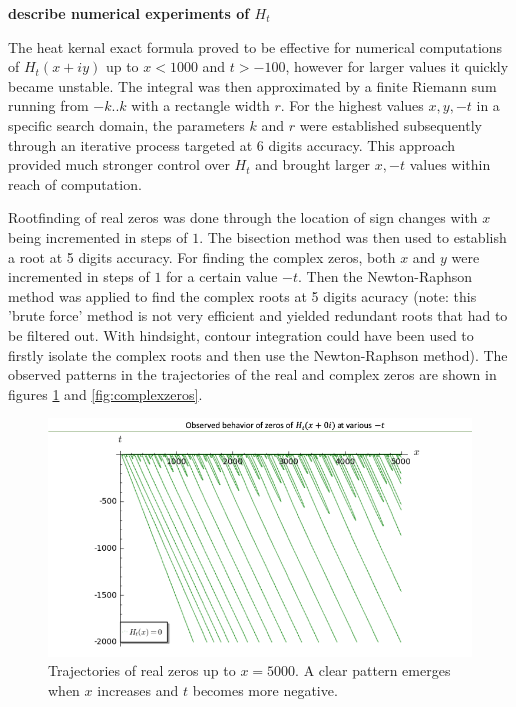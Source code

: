 \documentclass[a4paper,11pt,twoside]{amsart}
\begin{document}
{\bf describe numerical experiments of $H_t$}

The heat kernal exact formula proved to be effective for numerical computations of $H_t(x+iy)$ up to $x<1000$ and $t > -100$, however for larger values it quickly became unstable. The integral was then approximated by a finite Riemann sum running from $-k..k$ with a rectangle width $r$. For the highest values $x, y, -t$ in a specific search domain, the parameters $k$ and $r$ were established subsequently through an iterative process targeted at 6 digits accuracy. This approach provided much stronger control over $H_t$ and brought larger $x, -t$ values within reach of computation.

Rootfinding of real zeros was done through the location of sign changes with $x$ being incremented in steps of $1$. The bisection method was then used to establish a root at 5 digits accuracy. For finding the complex zeros,  both $x$ and $y$ were incremented in steps of $1$ for a certain value $-t$. Then the Newton-Raphson method was applied to find the complex roots at 5 digits acuracy (note: this 'brute force' method is not very efficient and yielded redundant roots that had to be filtered out. With hindsight, contour integration could have been used to firstly isolate the complex roots and then use the Newton-Raphson method). The observed patterns in the trajectories of the real and complex zeros are shown in figures \ref{fig:realzeros}  and  \ref{fig:complexzeros}.

\begin{figure}[h!]
  \includegraphics[width=0.8\linewidth]{traj_realzeros.png}
  \caption{Trajectories of real zeros up to $x=5000$. A clear pattern emerges when $x$ increases and $t$ becomes more negative.}
  \label{fig:realzeros}
\end{figure}
\end{document}
